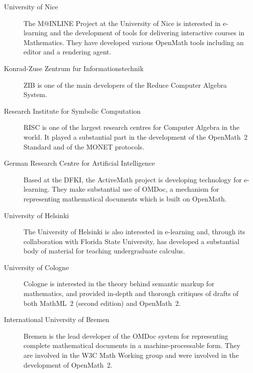 \documentclass{euproposal}
\begin{document}
\begin{description}
 
\item[University of Nice] The M@INLINE Project at the University of
  Nice is interested in e-learning and the development of tools for
  delivering interactive courses in Mathematics.  They have developed
  various OpenMath tools including an editor and a rendering agent.
  
\item[Konrad-Zuse Zentrum fur Informationstechnik] ZIB is one of the
  main developers of the Reduce Computer Algebra System.


\item[Research Institute for Symbolic Computation] RISC is one of the
  largest research centres for Computer Algebra in the world.  It
  played a substantial part in the development of the OpenMath~2
  Standard and of the MONET protocols.
  
\item[German Research Centre for Artificial Intelligence] Based at the
  DFKI, the ActiveMath project is developing technology for
  e-learning.  They make substantial use of OMDoc, a mechanism for
  representing mathematical documents which is built on OpenMath.
  
\item[University of Helsinki] The University of Helsinki is also
  interested in e-learning and, through its collaboration with Florida
  State University, has developed a substantial body of material for
  teaching undergraduate calculus.
  
\item[University of Cologne] Cologne is interested in the theory
  behind semantic markup for mathematics, and provided in-depth and
  thorough critiques of drafts of both MathML~2 (second edition) and
  OpenMath~2.
  
\item[International University of Bremen] Bremen is the lead developer
  of the OMDoc system for representing complete mathematical documents
  in a machine-processable form.  They are involved in the W3C Math
  Working group and were involved in the development of OpenMath~2.

\end{description}
\end{document}
